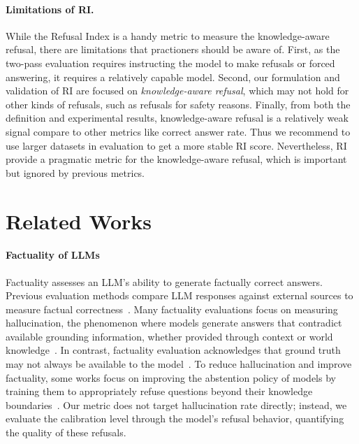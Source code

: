 \documentclass{article} %
\theoremstyle{definition}
\begin{document}
\paragraph{Limitations of RI.}
While the Refusal Index is a handy metric to measure the knowledge-aware refusal, there are limitations that practioners should be aware of. First, as the two-pass evaluation requires instructing the model to make refusals or forced answering, it requires a relatively capable model. Second, our formulation and validation of RI are focused on \emph{knowledge-aware refusal}, which may not hold for other kinds of refusals, such as refusals for safety reasons. Finally, from both the definition and experimental results, knowledge-aware refusal is a relatively weak signal compare to other metrics like correct answer rate. Thus we recommend to use larger datasets in evaluation to get a more stable RI score. Nevertheless, RI provide a pragmatic metric for the knowledge-aware refusal, which is important but ignored by previous metrics.

\section{Related Works}
\label{sec:related_works}

\paragraph{Factuality of LLMs}

Factuality assesses an LLM's ability to generate factually correct answers.
Previous evaluation methods compare LLM responses against external sources to measure factual correctness~\citep{wei2024measuringshortformfactualitylarge, min-etal-2023-factscore, kwiatkowski-etal-2019-natural}.
Many factuality evaluations focus on measuring hallucination, the phenomenon where models generate answers that contradict available grounding information, whether provided through context or world knowledge~\citep{bangHalluLensLLMHallucination2025}. In contrast, factuality evaluation acknowledges that ground truth may not always be available to the model~\citep{jing2025factuality}.
To reduce hallucination and improve factuality, some works focus on improving the abstention policy of models by training them to appropriately refuse questions beyond their knowledge boundaries~\citep{cao2024learn, xu2024reliability, ouyang-etal-2022-training}.
Our metric does not target hallucination rate directly; instead, we evaluate the calibration level through the model's refusal behavior, quantifying the quality of these refusals.
\end{document}
